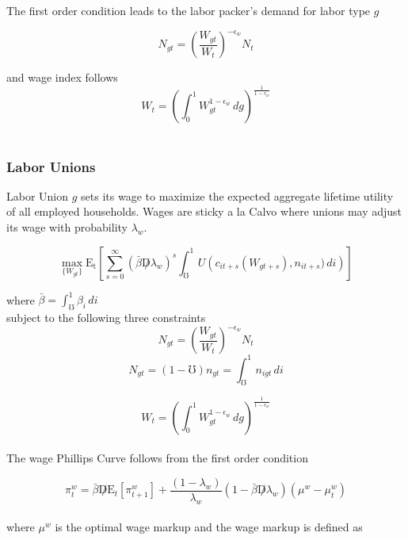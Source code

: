 \documentclass[titlepage]{\econtex}\providecommand{\texname}{FBS-NK}
\begin{document}
The first order condition leads to the labor packer's demand for labor type $g$

\begin{equation} N_{gt} = \left(\frac{W_{gt}}{W_{t}}\right)^{-\epsilon_{w}} N_{t} \end{equation}

and wage index follows
\begin{equation} W_{t} = \left(\int_{0}^{1} W_{gt}^{1-\epsilon_{w}}\,dg\right)^{\frac{1}{1-\epsilon_{w}}}\end{equation} \\




\hypertarget{Labor Unions}{}
\subsubsection{Labor Unions}

Labor Union $g$  sets its wage to maximize the expected aggregate lifetime utility of all employed households. Wages are sticky a la Calvo where unions may adjust its wage with probability $\lambda_{w}$. 

$$ \max_{\{W_{gt}\}} \mathrm{E_{t}}\left[\sum_{s=0}^{\infty} (\bar{\beta} \not D \lambda_{w})^{s} \int_{\mho}^{1}  U\left (c_{it+s}(W_{gt+s}), n_{i t+s}) \, di \right)\right] $$

where $\bar{\beta} = \int_{\mho}^{1} \beta_{i} \, di$ \\

subject to the following three constraints $$ N_{gt} = \left(\frac{W_{gt}}{W_{t}}\right)^{-\epsilon_{w}} N_{t} $$
$$  N_{gt} = (1-\mho) \mathit{n}_{gt} = \int_{\mho}^{1} n_{igt}\,di $$ 

$$ W_{t} = \left(\int_{0}^{1} W_{gt}^{1-\epsilon_{w}}\,dg\right)^{\frac{1}{1-\epsilon_{w}}}$$ \\



The wage Phillips Curve follows from the first order condition


\begin{equation} \pi_{t}^{w} =   \bar{\beta} \not D  \mathrm{E}_{t} \left[ \pi_{t+1}^{w}\right] + \frac{(1-\lambda_{w})}{\lambda_{w}} (1- \bar{\beta} \not D \lambda_{w}) (\mu^{w} - \mu_{t}^{w})\end{equation} \\

where $\mu^{w}$ is the optimal wage markup and the wage markup is defined as \\ 
\end{document}
